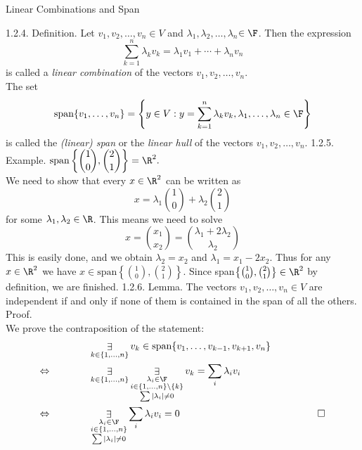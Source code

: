 \documentclass[smaller,hyperref={CJKbookmarks=true}]{beamer}
\newcommand{\myseries}[2]{$#1_1,#1_2,\dots,#1_#2$}
\begin{document}
\begin{frame}{Linear Combinations and Span} \begin{spacing}{1}
\alert{1.2.4. Definition.} Let \myseries{v}{n}$\in V$ and \myseries{\lambda}{n}$\in\F$. Then the expression
\begin{equation*}
  \sum_{k=1}^{n}\lambda_kv_k=\lambda_1v_1+\cdots+\lambda_nv_n
\end{equation*}
is called a \emph{linear combination} of the vectors \myseries{v}{n}.\\
The set
\[\text{span}\{v_1,\ldots,v_n\}=\left\{y\in V:y=\sum_{k=1}^{n}\lambda_kv_k,\lambda_1,\ldots,\lambda_n\in\F\right\}\]
is called the \emph{(linear) span} or the \emph{linear hull} of the vectors \myseries{v}{n}.
\newpage
\alert{1.2.5. Example.} $\displaystyle\text{span}\left\{\binom{1}{0},\binom{2}{1}\right\}=\R^2.$\\
We need to show that every $x\in\R^2$ can be written as
\begin{equation*}
  x=\lambda_1\binom{1}{0}+\lambda_2\binom{2}{1}
\end{equation*}
for some $\lambda_1,\lambda_2\in\R$. This means we need to solve
\begin{equation*}
  x=\binom{x_1}{x_2}=\binom{\lambda_1+2\lambda_2}{\lambda_2}
\end{equation*}
This is easily done, and we obtain $\lambda_2=x_2$ and $\lambda_1=x_1-2x_2$. Thus for any $x\in\R^2$ we have $x\in\text{span}\left\{\binom{1}{0},\binom{2}{1}\right\}$.
Since span$\left\{\binom{1}{0},\binom{2}{1}\right\}\in\R^2$ by definition, we are finished.
\newpage
\alert{1.2.6. Lemma.} The vectors \myseries{v}{n}$\in V$ are independent if and only if none of them is contained in the span of all the others.\\[13pt]
\alert{Proof.}\\
We prove the contraposition of the statement:
\begin{equation*}
  \begin{split}
       & \mathop{\exists}_{k\in\{1,\ldots,n\}}v_k\in\text{span}\{v_1,\ldots,v_{k-1},v_{k+1},v_n\}\\
      \Leftrightarrow\qquad\qquad &\mathop{\exists}_{k\in\{1,\ldots,n\}}\mathop{\exists}_{\begin{subarray}{c}\lambda_i\in\F\\ i\in\{1,\ldots,n\}\setminus\{k\}\\ \sum\vert\lambda_i\vert\neq0\end{subarray}}v_k=\sum\limits_{i}\lambda_iv_i\\
    \Leftrightarrow\qquad\qquad
    &\mathop{\exists}_{\begin{subarray}{c}\lambda_i\in\F\\ i\in\{1,\ldots,n\}\\ \sum\vert\lambda_i\vert\neq0\end{subarray}}\sum\limits_{i}\lambda_iv_i=0\qquad\qquad\qquad\qquad\qquad\qquad\qquad\square
  \end{split}
\end{equation*}
\end{spacing}
\end{frame}
\end{document}
